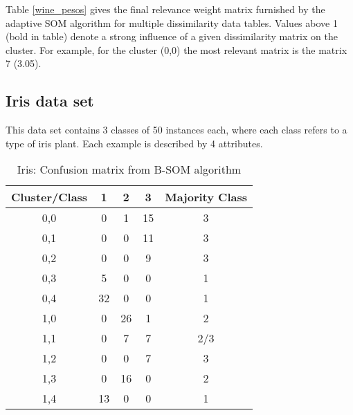 \documentclass[10pt, conference, compsocconf]{IEEEtran}
\begin{document}

Table \ref{wine_pesos} gives the final relevance weight matrix furnished by the adaptive SOM algorithm for multiple dissimilarity data tables. Values above 1 (bold in table) denote a strong influence of a given dissimilarity matrix on the cluster. For example, for the cluster (0,0) the most relevant matrix is the matrix 7 (3.05).

\subsection{Iris data set}

This data set contains 3 classes of 50 instances each, where each class refers to a type of iris plant. 
Each example is described by 4 attributes.

\begin{table}[!h]
\renewcommand{\arraystretch}{1.0}
\begin{center}
\caption{Iris: Confusion matrix from B-SOM algorithm}
\begin{tabular}{|c|c|c|c||c|}
\hline
Cluster/Class & 1 & 2 & 3 & Majority Class\\ \hline
0,0 & 0 & 1 & 15 & 3\\ \hline
0,1 & 0 & 0 & 11 & 3\\ \hline
0,2 & 0 & 0 & 9 & 3\\ \hline
0,3 & 5 & 0 & 0 & 1\\ \hline
0,4 & 32 & 0 & 0 & 1\\ \hline \hline
1,0 & 0 & 26 & 1 & 2\\ \hline
1,1 & 0 & 7 & 7 & 2/3\\ \hline
1,2 & 0 & 0 & 7 & 3\\ \hline
1,3 & 0 & 16 & 0 & 2\\ \hline
1,4 & 13 & 0 & 0 & 1\\ \hline
\end{tabular}
\label{iris_batch}
\end{center}
\end{table}
\end{document}
